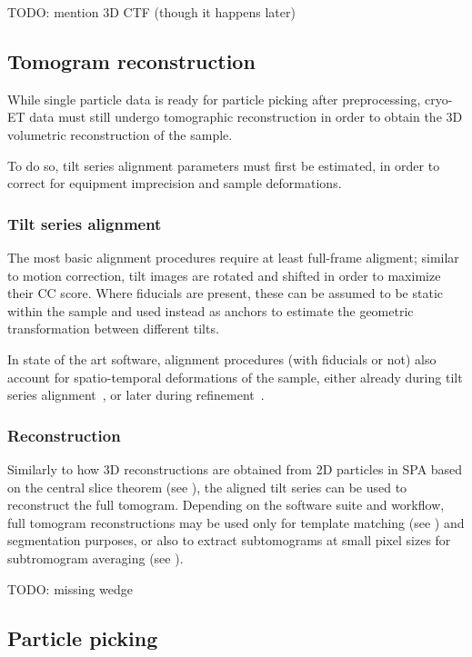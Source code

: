 TODO: mention 3D CTF (though it happens later)

\subsection{Tomogram reconstruction}
While single particle data is ready for particle picking after preprocessing, cryo-ET data must still undergo tomographic reconstruction in order to obtain the 3D volumetric reconstruction of the sample.

To do so, tilt series alignment parameters must first be estimated, in order to correct for equipment imprecision and sample deformations.

\subsubsection{Tilt series alignment}\label{et_tilt_series_alignment}
The most basic alignment procedures require at least full-frame aligment; similar to motion correction, tilt images are rotated and shifted in order to maximize their CC score.
Where fiducials are present, these can be assumed to be static within the sample and used instead as anchors to estimate the geometric transformation between different tilts.

In state of the art software, alignment procedures (with fiducials or not) also account for spatio-temporal deformations of the sample, either already during tilt series alignment~\cite{zhengAreTomoIntegratedSoftware2022}, or later during refinement~\cite{tegunovMultiparticleCryoEMRefinement2021,burtImageProcessingPipeline2024,galaz-montoyaSingleParticleTomography2015}.

\subsubsection{Reconstruction}
Similarly to how 3D reconstructions are obtained from 2D particles in SPA based on the central slice theorem (see ), the aligned tilt series can be used to reconstruct the full tomogram.
Depending on the software suite and workflow, full tomogram reconstructions may be used only for template matching (see ) and segmentation purposes, or also to extract subtomograms at small pixel sizes for subtromogram averaging (see ).

TODO: missing wedge

\subsection{Particle picking}\label{et_particle_picking}

